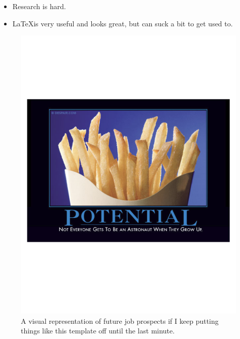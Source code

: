 \documentclass[final]{beamer}
\begin{document}
\begin{frame}[plain]{}
\begin{center}
\begin{minipage}[t]{.23\linewidth}
		{\Large {}}
	\begin{itemize}
	\item Research is hard.
	\item \LaTeX is very useful and looks great, but can suck a bit to get used to.
	\end{itemize}
		\begin{figure} \def\figurename{Fig.}
		\centering
	    \includegraphics[width=\textwidth, trim=60 190 0 190, clip]{./figs/potential} \vspace*{-2.0cm}
		\caption{A visual representation of future job prospects if I keep putting things like this template off until the last minute.}
		\label{fig:PMF}
	      \end{figure}	
	

\end{minipage}
\end{center}
\end{frame}
\end{document}
